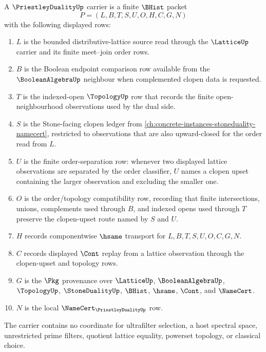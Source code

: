 \begin{definition}
\label{def:priestley-duality-carrier}
A $\PriestleyDualityUp$ carrier is a finite $\BHist$ packet
$$
P=(L,B,T,S,U,O,H,C,G,N)
$$
with the following displayed rows:
\begin{enumerate}
\item $L$ is the bounded distributive-lattice source read through the $\LatticeUp$ carrier and its finite meet--join order rows.
\item $B$ is the Boolean endpoint comparison row available from the $\BooleanAlgebraUp$ neighbour when complemented clopen data is requested.
\item $T$ is the indexed-open $\TopologyUp$ row that records the finite open-neighbourhood observations used by the dual side.
\item $S$ is the Stone-facing clopen ledger from \autoref{ch:concrete-instances-stoneduality-namecert}, restricted to observations that are also upward-closed for the order read from $L$.
\item $U$ is the finite order-separation row: whenever two displayed lattice observations are separated by the order classifier, $U$ names a clopen upset containing the larger observation and excluding the smaller one.
\item $O$ is the order/topology compatibility row, recording that finite intersections, unions, complements used through $B$, and indexed opens used through $T$ preserve the clopen-upset route named by $S$ and $U$.
\item $H$ records componentwise $\hsame$ transport for $L,B,T,S,U,O,C,G,N$.
\item $C$ records displayed $\Cont$ replay from a lattice observation through the clopen-upset and topology rows.
\item $G$ is the $\Pkg$ provenance over $\LatticeUp$, $\BooleanAlgebraUp$, $\TopologyUp$, $\StoneDualityUp$, $\BHist$, $\hsame$, $\Cont$, and $\NameCert$.
\item $N$ is the local $\NameCert_{\PriestleyDualityUp}$ row.
\end{enumerate}
The carrier contains no coordinate for ultrafilter selection, a host spectral space, unrestricted prime filters, quotient lattice equality, powerset topology, or classical choice.
\end{definition}

